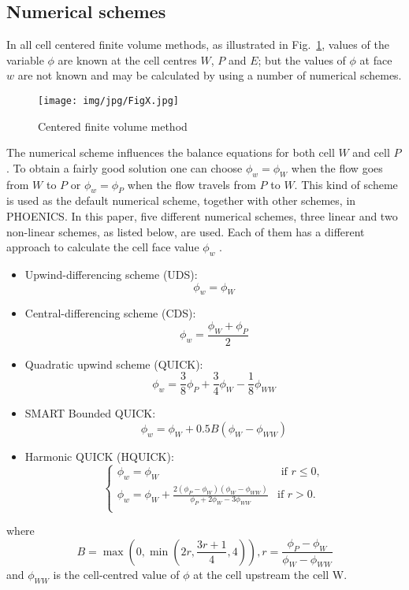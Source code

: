 \documentclass[10pt]{article}
\theoremstyle{plain}
\theoremstyle{definition}
\theoremstyle{remark}
\begin{document}
\subsection{Numerical schemes} 

In all cell centered finite volume methods, as illustrated in Fig.~\ref{FigX}, values of the variable $\phi$ are known at the cell centres $W$, $P$ and $E$; but the values of $\phi$ at face $w$ are not known and may be calculated by using a number of numerical schemes.
%
\begin{figure}[htbp]
\centering
\texttt{[image: img/jpg/FigX.jpg]}
\caption{Centered finite volume method}\label{FigX}
\end{figure}
%

The numerical scheme influences the balance equations for both cell $W$ and cell $P$.
To obtain a fairly good solution one can choose $\phi_w = \phi_W$ when the flow goes from $W$ to $P$ or $\phi_w = \phi_P$ when the flow travels from $P$ to $W$.
This kind of scheme is used as the default numerical scheme, together with other schemes, in PHOENICS.
In this paper, five different numerical schemes, three linear and two non-linear schemes, as listed below, are used.
Each of them has a different approach to calculate the cell face value $\phi_w$ .
%
\begin{itemize}
\item Upwind-differencing scheme (UDS): \\
$$\phi_w = \phi_W$$
\item Central-differencing scheme (CDS): \\
$$\phi_w = \frac{\phi_W + \phi_P}{2}$$
\item Quadratic upwind scheme (QUICK): \\
$$\phi_w = \frac{3}{8}\phi_P + \frac{3}{4}\phi_W - \frac{1}{8}\phi_{WW}$$
\item SMART Bounded QUICK: \\
$$\phi_w = \phi_W + 0.5 B (\phi_W-\phi_{WW})$$
\item Harmonic QUICK (HQUICK): \\
$$\left \{ \begin{array} {ll}
\phi_w = \phi_W & \textrm{ if  $r \leq 0 $}, \\ [0.2cm]
\phi_w = \phi_W + \frac{2(\phi_P-\phi_{W})(\phi_W-\phi_{WW})}{\phi_P + 2\phi_{W} - 3\phi_{WW}} & \textrm{if $r > 0 $}. \\
\end{array} \right.$$
\end{itemize}
%
where
%
$$B = \max \left( 0 , \min \left( 2r, \frac{3r+1}{4} , 4 \right) \right), r= \displaystyle{\frac{\phi_P - \phi_W}{\phi_W - \phi_{WW}}}$$
%
and $\phi_{WW}$ is the cell-centred value of $\phi$ at the cell upstream the cell W.
\end{document}

